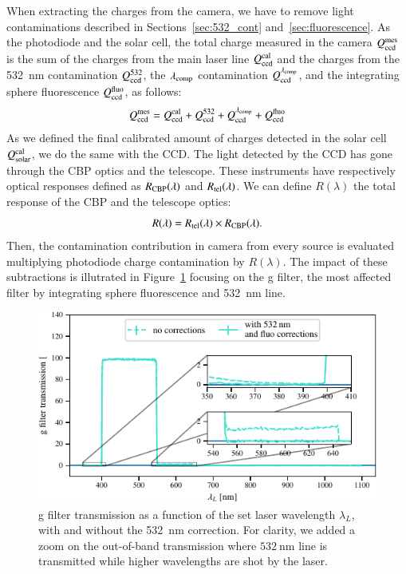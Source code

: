 When extracting the charges from the \SD camera, we have to remove light contaminations described in Sections~\ref{sec:532_cont} and~\ref{sec:fluorescence}. As the photodiode and the solar cell, the total charge measured in the \SD camera $Q_{\mathrm{ccd}}^{\mathrm{mes}}$ is the sum of the charges from the main laser line $Q_{\mathrm{ccd}}^{\mathrm{cal}}$ and the charges from the \SI{532}{\nm} contamination $Q_{\mathrm{ccd}}^{532}$, the $\lambda_{\rm comp}$ contamination $Q_{\mathrm{ccd}}^{\lambda_{\rm comp}}$, and the integrating sphere fluorescence $Q_{\mathrm{ccd}}^{\mathrm{fluo}}$, as follows:
\begin{equation}
    Q_{\mathrm{ccd}}^{\mathrm{mes}} = Q_{\mathrm{ccd}}^{\mathrm{cal}} + Q_{\mathrm{ccd}}^{532} + Q_{\mathrm{ccd}}^{\lambda_{\rm comp}} + Q_{\mathrm{ccd}}^{\mathrm{fluo}}
    \label{eq:qccd_mes}
\end{equation}
As we defined the final calibrated amount of charges detected in the solar cell $Q_{\mathrm{solar}}^{\mathrm{cal}}$, we do the same with the \SD CCD. The light detected by the \SD CCD has gone through the CBP optics and the \SD telescope. These instruments have respectively optical responses defined as $R_{\mathrm{CBP}}(\lambda)$ and $R_{\mathrm{tel}}(\lambda)$. We can define $R(\lambda)$ the total response of the CBP and the \SD telescope optics:
\begin{equation}
    R(\lambda) = R_{\mathrm{tel}}(\lambda) \times R_{\mathrm{CBP}}(\lambda).
    \label{eq:rtot}
\end{equation}
Then, the contamination contribution in \SD camera from every source is evaluated multiplying photodiode charge contamination by $R(\lambda)$.
The impact of these subtractions is illutrated in Figure~\ref{fig:g_filter_532} focusing on the \SD g filter, the most affected filter by integrating sphere fluorescence and \SI{532}{\nano\meter} line.

\begin{figure}[h]
    \centering
    \includegraphics[width=\columnwidth]{fig/g_filter_532.pdf}
    \caption{\SD g filter transmission as a function of the set laser wavelength $\lambda_L$, with and without the \SI{532}{\nm} correction. For clarity, we added a zoom on the out-of-band transmission where $\SI{532}{\nm}$ line is transmitted while higher wavelengths are shot by the laser.}
    \label{fig:g_filter_532}
\end{figure}

